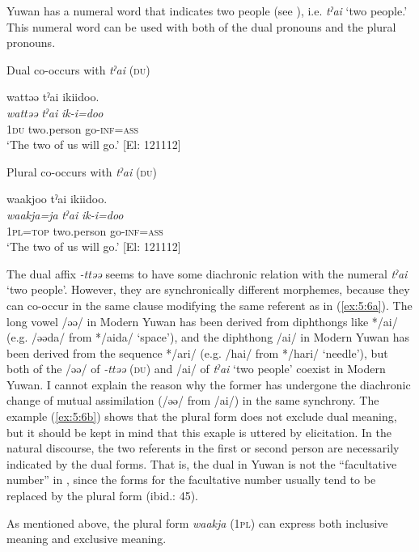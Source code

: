 Yuwan has a numeral word that indicates two people (see ), i.e. \textit{tˀai} ‘two people.’ This numeral word can be used with both of the dual pronouns and the plural pronouns.

\ea \label{ex:5:6}  \ea \label{ex:5:6a} Dual co-occurs with \textit{tˀai} (\textsc{du})

\glll  wattəə  tˀai  ikiidoo.\\
\textit{wattəə}  \textit{tˀai}  \textit{ik-i=doo}\\
1\textsc{du}  two.person  go-\textsc{inf}=\textsc{ass}\\
\glt ‘The two of us will go.’ [El: 121112]

\ex \label{ex:5:6b} Plural co-occurs with \textit{tˀai} (\textsc{du})

\glll  waakjoo  tˀai  ikiidoo.\\
\textit{waakja=ja}  \textit{tˀai}  \textit{ik-i=doo}\\
1\textsc{pl}=\textsc{top}  two.person  go-\textsc{inf}=\textsc{ass}\\
\glt ‘The two of us will go.’ [El: 121112]
\z
\z

\noindent The dual affix \textit{{}-ttəə} seems to have some diachronic relation with the numeral \textit{tˀai} ‘two people’. However, they are synchronically different morphemes, because they can co-occur in the same clause modifying the same referent as in (\ref{ex:5:6a}). The long vowel /əə/ in Modern Yuwan has been derived from diphthongs like */ai/ (e.g. /əəda/ from */aida/ ‘space’), and the diphthong /ai/ in Modern Yuwan has been derived from the sequence */ari/ (e.g. /hai/ from */hari/ ‘needle’), but both of the /əə/ of \textit{-ttəə} (\textsc{du}) and /ai/ of \textit{tˀai} ‘two people’ coexist in Modern Yuwan. I cannot explain the reason why the former has undergone the diachronic change of mutual assimilation (/əə/ from /ai/) in the same synchrony. The example (\ref{ex:5:6b}) shows that the plural form does not exclude dual meaning, but it should be kept in mind that this exaple is uttered by elicitation. In the natural discourse, the two referents in the first or second person are necessarily indicated by the dual forms. That is, the dual in Yuwan is not the “facultative number” in \citet{Corbett2000}, since the forms for the facultative number usually tend to be replaced by the plural form (ibid.: 45).

As mentioned above, the plural form \textit{waakja} (1\textsc{pl}) can express both inclusive meaning and exclusive meaning.

